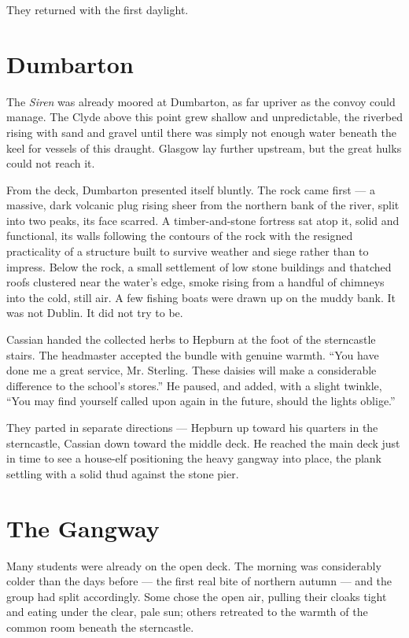 They returned with the first daylight.

\section*{Dumbarton}

The \textit{Siren} was already moored at Dumbarton, as far upriver as the convoy could manage. The Clyde above this point grew shallow and unpredictable, the riverbed rising with sand and gravel until there was simply not enough water beneath the keel for vessels of this draught. Glasgow lay further upstream, but the great hulks could not reach it.

From the deck, Dumbarton presented itself bluntly. The rock came first --- a massive, dark volcanic plug rising sheer from the northern bank of the river, split into two peaks, its face scarred. A timber-and-stone fortress sat atop it, solid and functional, its walls following the contours of the rock with the resigned practicality of a structure built to survive weather and siege rather than to impress. Below the rock, a small settlement of low stone buildings and thatched roofs clustered near the water's edge, smoke rising from a handful of chimneys into the cold, still air. A few fishing boats were drawn up on the muddy bank. It was not Dublin. It did not try to be.

Cassian handed the collected herbs to Hepburn at the foot of the sterncastle stairs. The headmaster accepted the bundle with genuine warmth. \enquote{You have done me a great service, Mr. Sterling. These daisies will make a considerable difference to the school's stores.} He paused, and added, with a slight twinkle, \enquote{You may find yourself called upon again in the future, should the lights oblige.}

They parted in separate directions --- Hepburn up toward his quarters in the sterncastle, Cassian down toward the middle deck. He reached the main deck just in time to see a house-elf positioning the heavy gangway into place, the plank settling with a solid thud against the stone pier.

\section*{The Gangway}


Many students were already on the open deck. The morning was considerably colder than the days before --- the first real bite of northern autumn --- and the group had split accordingly. Some chose the open air, pulling their cloaks tight and eating under the clear, pale sun; others retreated to the warmth of the common room beneath the sterncastle.

